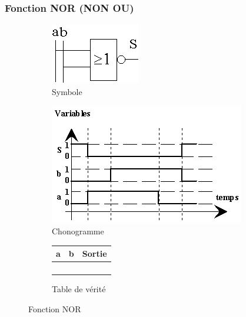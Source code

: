\documentclass[10pt,fleqn]{article} %
\begin{document}
\subsubsection{Fonction NOR (NON OU)}
\begin{figure}[ht]
  \begin{subfigure}{.2\textwidth}
    \includegraphics[width=\textwidth]{images/nor_symb}
    \caption{Symbole}
    \centering
  \end{subfigure}
  \begin{subfigure}{.4\textwidth}
    \centering
    \includegraphics[width=\textwidth]{images/nor_chrono}
    \caption{Chonogramme}
  \end{subfigure}
  \begin{subfigure}{.33\textwidth}
    \centering
    \begin{tabular}{|c|c|c|}
      \hline
      \textbf{a}&  \textbf{b}& \textbf{Sortie} \\
      \hline
       & & \\ \hline
       & & \\ \hline
       & & \\ \hline
       & & \\ \hline
    \end{tabular}
    \caption{Table de vérité}
  \end{subfigure}
  \caption{Fonction NOR}
\end{figure}
\end{document}
